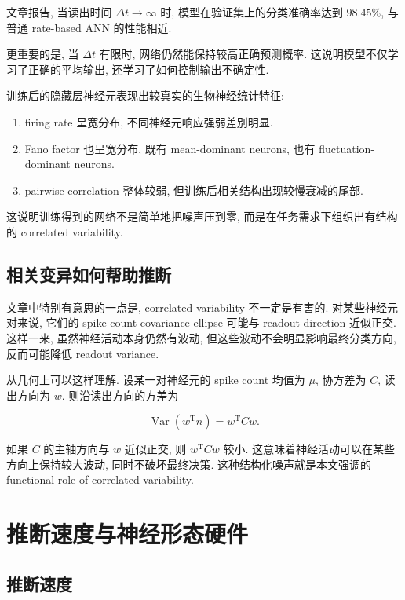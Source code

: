 \documentclass[oneside]{ctexart}
\begin{document}
文章报告, 当读出时间 $\Delta t\to\infty$ 时, 模型在验证集上的分类准确率达到 $98.45\%$, 与普通 rate-based ANN 的性能相近.

更重要的是, 当 $\Delta t$ 有限时, 网络仍然能保持较高正确预测概率. 这说明模型不仅学习了正确的平均输出, 还学习了如何控制输出不确定性.

训练后的隐藏层神经元表现出较真实的生物神经统计特征:

\begin{enumerate}[(1)]
    \item firing rate 呈宽分布, 不同神经元响应强弱差别明显.
    \item Fano factor 也呈宽分布, 既有 mean-dominant neurons, 也有 fluctuation-dominant neurons.
    \item pairwise correlation 整体较弱, 但训练后相关结构出现较慢衰减的尾部.
\end{enumerate}

这说明训练得到的网络不是简单地把噪声压到零, 而是在任务需求下组织出有结构的 correlated variability.

\subsection{相关变异如何帮助推断}

文章中特别有意思的一点是, correlated variability 不一定是有害的. 对某些神经元对来说, 它们的 spike count covariance ellipse 可能与 readout direction 近似正交. 这样一来, 虽然神经活动本身仍然有波动, 但这些波动不会明显影响最终分类方向, 反而可能降低 readout variance.

从几何上可以这样理解. 设某一对神经元的 spike count 均值为 $\mu$, 协方差为 $C$, 读出方向为 $w$. 则沿读出方向的方差为

\begin{equation}
    \operatorname{Var}(w^{\mathrm T}n)
    =
    w^{\mathrm T}Cw.
\end{equation}

如果 $C$ 的主轴方向与 $w$ 近似正交, 则 $w^{\mathrm T}Cw$ 较小. 这意味着神经活动可以在某些方向上保持较大波动, 同时不破坏最终决策. 这种结构化噪声就是本文强调的 functional role of correlated variability.

\section{推断速度与神经形态硬件}

\subsection{推断速度}
\end{document}
